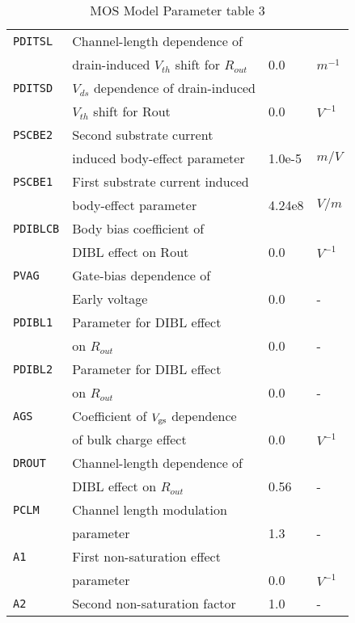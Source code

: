 \documentclass{article}
\begin{document}
\begin{table}[H]
\begin{tabular}{|l| l| l| l|}
\texttt{PDITSL} & Channel-length dependence of & & \\
                & drain-induced $V_{th}$ shift for $R_{out}$ & 0.0 & $m^{-1}$\\
\texttt{PDITSD} & $V_{ds}$ dependence of drain-induced & & \\
                & $V_{th}$ shift for Rout & 0.0 & $V^{-1}$\\
\texttt{PSCBE2} & Second substrate current & & \\
                & induced body-effect parameter & 1.0e-5 & $m/V$\\
\texttt{PSCBE1} & First substrate current induced & & \\
                & body-effect parameter & 4.24e8 & $V/m$\\
\texttt{PDIBLCB} & Body bias coefficient of & & \\
                 & DIBL effect on Rout & 0.0 & $V^{-1}$\\
\texttt{PVAG} & Gate-bias dependence of & & \\
              & Early voltage & 0.0 & - \\
\texttt{PDIBL1} & Parameter for DIBL effect & & \\
                & on $R_{out}$ & 0.0 & - \\
\texttt{PDIBL2} & Parameter for DIBL effect & & \\
                & on $R_{out}$ & 0.0 & - \\
\texttt{AGS} & Coefficient of $V_{\rm{gs}}$ dependence & & \\
             & of bulk charge effect & 0.0 & $V^{-1}$ \\
\texttt{DROUT} & Channel-length dependence of & & \\
               & DIBL effect on $R_{out}$ & 0.56 & -\\
\texttt{PCLM} & Channel length modulation & & \\
              & parameter & 1.3 & - \\
\texttt{A1} & First non-saturation effect & & \\
            & parameter & 0.0 & $V^{-1}$\\
\texttt{A2} & Second non-saturation factor & 1.0 & - \\
\hline
\end{tabular}
\caption{\label{bsim4.params3} MOS Model Parameter table 3}
\end{table}
\end{document}
